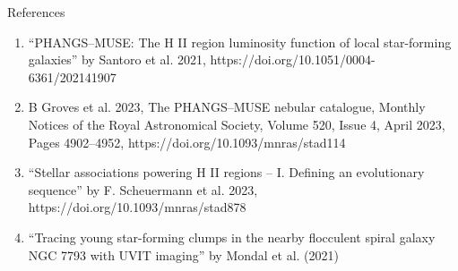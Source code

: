 \documentclass{beamer}
\begin{document}
\begin{frame}{References}
    \begin{enumerate}
        \item ``PHANGS–MUSE: The H II region luminosity function of local star-forming galaxies'' by Santoro et al. 2021, 	https://doi.org/10.1051/0004-6361/202141907
        \item B Groves et al. 2023, The PHANGS–MUSE nebular catalogue, Monthly Notices of the Royal Astronomical Society, Volume 520, Issue 4, April 2023, Pages 4902–4952, https://doi.org/10.1093/mnras/stad114
        \item ``Stellar associations powering H II regions – I. Defining an evolutionary
        sequence'' by F. Scheuermann et al. 2023, https://doi.org/10.1093/mnras/stad878
        \item ``Tracing young star-forming clumps in the nearby flocculent spiral galaxy NGC 7793 with UVIT imaging'' by Mondal et al. (2021)
    \end{enumerate}
    
\end{frame}
\end{document}
